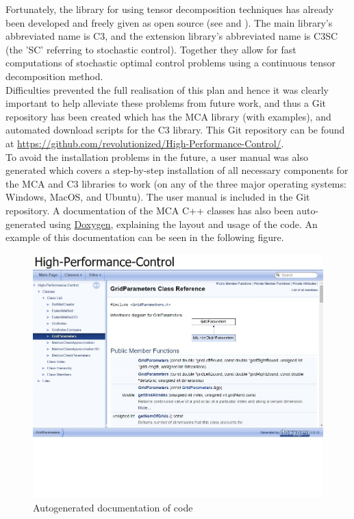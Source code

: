 \documentclass[11pt,draftd]{article}
\begin{document}
Fortunately, the library for using tensor decomposition techniques has already been developed and freely given as open source (see \cite{c3c} and \cite{c3cs}). The main library's abbreviated name is C3, and the extension library’s abbreviated name is C3SC (the 'SC' referring to stochastic control). Together they allow for fast computations of stochastic optimal control problems using a continuous tensor decomposition method. \\

Difficulties prevented the full realisation of this plan and hence it was clearly important to help alleviate these problems from future work, and thus a Git repository has been created which has the MCA library (with examples), and automated download scripts for the C3 library. This Git repository can be found at \url{https://github.com/revolutionized/High-Performance-Control/}. \\

To avoid the installation problems in the future, a user manual was also generated which covers a step-by-step installation of all necessary components for the MCA and C3 libraries to work (on any of the three major operating systems: Windows, MacOS, and Ubuntu). The user manual is included in the Git repository. A documentation of the MCA C++ classes has also been auto-generated using \href{https://www.stack.nl/~dimitri/doxygen/}{Doxygen}, explaining the layout and usage of the code. An example of this documentation can be seen in the following figure. \\
\begin{figure}[h!]
	\centering
	\label{doxygen-documentation}
	\includegraphics[scale = 0.63]{images/doxygen-example}
	\caption{Autogenerated documentation of code}
\end{figure}
\[\]
\end{document}
